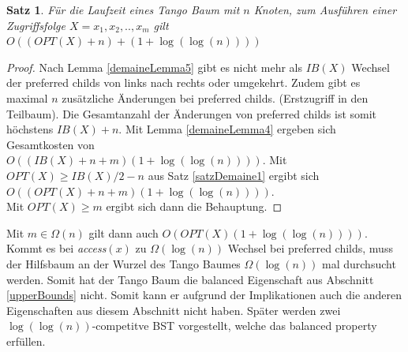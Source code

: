 \documentclass[a4paper,12pt]{article}
\newtheorem{Satz}{Satz}[section]
\begin{document}
\begin{Satz} \label{demaineSatz2}
	Für die Laufzeit eines Tango Baum mit $n$ Knoten, zum Ausführen einer Zugriffsfolge $X = x_1, x_2,.., x_m$ gilt $O\left(\left(\mathit{OPT}\left(X\right) + n\right)  + \left(  1 + \log\left(\log \left(n\right)\right)\right)   \right)$
\end{Satz}
\begin{proof}
	Nach Lemma \ref{demaineLemma5} gibt es nicht mehr als  $\mathit{IB}\left(X\right)$ Wechsel der preferred childs von links nach rechts oder umgekehrt. Zudem gibt es maximal $n$ zusätzliche Änderungen bei preferred childs. (Erstzugriff in den Teilbaum). Die Gesamtanzahl der Änderungen von preferred childs ist somit höchstens $\mathit{IB}\left(X\right) + n$. Mit Lemma \ref{demaineLemma4} ergeben sich Gesamtkosten von\\ $O\left(\left(\mathit{IB}\left(X\right) + n +m \right) \left( 1 + \log \left(\log\left(n\right)\right)\right) \right)$. Mit $\mathit{OPT}\left(X\right) \geq \mathit{IB}\left(X\right) /2 -n $ aus Satz \ref{satzDemaine1} ergibt sich 
	$O\left(\left(\mathit{OPT}\left(X\right) + n +m \right) \left( 1 + \log \left(\log\left(n\right)\right)\right) \right)$.\\ Mit $\mathit{OPT}\left(X\right) \geq m$ ergibt sich dann die Behauptung.
\end{proof}
\noindent Mit $m \in \Omega\left(n\right)$ gilt dann auch 
$O\left(	\mathit{OPT}\left(X\right) 	\left( 1 + \log \left(\log \left(n\right)\right)\right)	 \right)$.\\
 Kommt es bei \textit{access}$\left(x\right)$ zu $\Omega\left(\log\left(n\right)\right)$ Wechsel bei preferred childs, muss der Hilfsbaum an der Wurzel des Tango Baumes $\Omega\left(\log\left(n\right)\right)$ mal durchsucht werden. Somit hat der Tango Baum die balanced Eigenschaft aus Abschnitt \ref{upperBounds} nicht. Somit kann er aufgrund der Implikationen auch die anderen Eigenschaften aus diesem Abschnitt nicht haben. Später werden zwei $\log\left(\log\left(n\right)\right)$-competitve BST vorgestellt, welche das balanced property erfüllen.      
\end{document}
